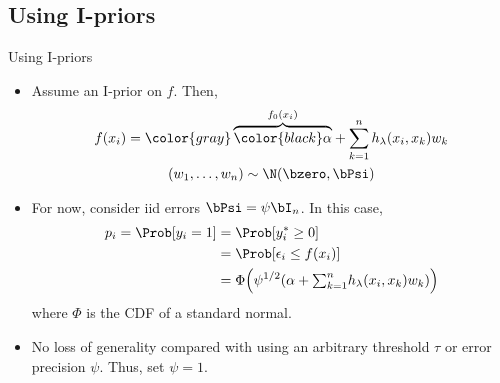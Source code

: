 \subsection{Using I-priors}
\begin{frame}{Using I-priors}
  \vspace{-5pt}
  \begin{itemize}\setlength\itemsep{0.5em}
    \item Assume an I-prior on $f$. Then,
    \begin{align*}
      \begin{gathered}
        f(x_i) = {\color{gray} \overbrace{\color{black} \alpha}^{f_0(x_i)}} 
        + \sum_{k=1}^n h_\lambda(x_i, x_k)w_k \\
        (w_1, \dots, w_n) \sim \N(\bzero, \bPsi) \\
      \end{gathered}
    \end{align*}
    \item For now, consider iid errors $\bPsi = \psi\bI_n$. In this case,
    \begin{align*}
      p_i = \Prob[y_i = 1] &= \Prob[y_i^* \geq 0] \\
      &= \Prob[\epsilon_i \leq f(x_i)] \\
      &= \Phi\Big(\psi^{1/2} ( 
      \alpha + {\textstyle\sum_{k=1}^n} h_\lambda(x_i, x_k)w_k
      ) \Big)
    \end{align*}
    where $\Phi$ is the CDF of a standard normal.
    \item No loss of generality compared with using an arbitrary threshold $\tau$ or error precision $\psi$. Thus, set $\psi = 1$.
  \end{itemize}
\end{frame}

